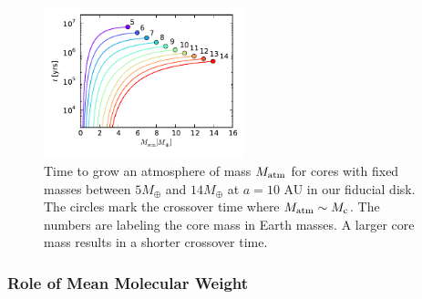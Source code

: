 \documentclass[apj]{emulateapj}
\begin{document}



\begin{figure}[h]
\centering
\includegraphics[width=0.52\textwidth]{../../figs/ModelAtmospheres/RadSelfGravPoly/PaperFigs/cumul_coolingtime_vs_Matm_10au_mu235.pdf}
\caption{Time to grow an atmosphere of mass $M_{\rm{atm}}$ for cores with fixed masses between $5 M_{\oplus}$ and $14 M_{\oplus}$ at $a=10$ AU in our fiducial disk. The circles mark the crossover time where $M_{\rm{atm}} \sim M_{\rm c}$. The numbers are labeling the core mass in Earth masses. A larger core mass results in a shorter crossover time.}
\label{fig:tvsM}
\end{figure}



\subsubsection{Role of Mean Molecular Weight}
\label{muopacity}

\end{document}
